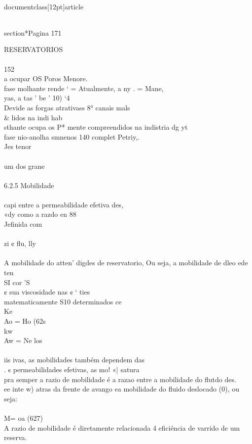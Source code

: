 \\documentclass[12pt]{article}
\begin{document}
\\section*{Pagina 171}

RESERVATORIOS\\
\\
152\\
a ocupar OS Poros Menore.\\
fase molhante rende ‘ = Atualmente, a ny . = Mane,\\
yas, a tas ’ be ’ 10) ‘4\\
Devide as forgas atrativass 8° canais mals \\& lidos na indi hab\\
sthante ocupa os P* mente compreendidos na indistria dg yt\\
fase nio-anolha smnenos 140 complet Petriy,.\\
Jes tenor\\
\\
um dos grane\\
\\
6.2.5 Mobilidade\\
\\
capi entre a permeabilidade efetiva des,\\
«dy como a razdo en 88\\
Jefinida com\\
\\
zi ¢ flu, lly\\
\\
A mobilidade do atten’ digdes de reservatorio, Ou seja, a mobilidade de dleo ede ten\\
SI cor 'S\\
¢ sua viscosidade nas ¢ ‘ ties\\
matematicamente S10 determinados ce\\
Ke\\
Ao = Ho (62s\\
kw\\
Aw = Ne los\\
\\
iis ivas, as mobilidades também dependem das\\
. s permeabilidades efetivas, as mo! «| satura\\
pra semper a razio de mobilidade é a razao entre a mobilidade do flutdo des.\\
ee inte w) atras da frente de avango ea mobilidade do fluido deslocado (0), ou seja:\\
\\
M= oa (627)\\
A razio de mobilidade é diretamente relacionada 4 eficiéncia de varrido de um reserva.\\
\end{document}
